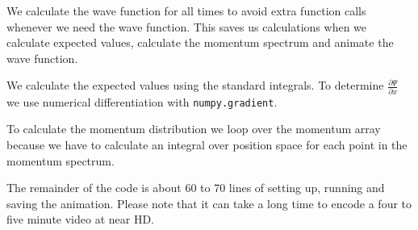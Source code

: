 \documentclass[12pt,a4paper]{article}
\newcommand{\pdiff}[2]{\frac{\partial #1}{\partial #2}}
\begin{document}


We calculate the wave function for all times to avoid extra function calls whenever we need the wave function. This saves us calculations when we calculate expected values, calculate the momentum spectrum and animate the wave function.



We calculate the expected values using the standard integrals. To determine $\pdiff{\Psi}{x}$ we use numerical differentiation with \lstinline{numpy.gradient}.


To calculate the momentum distribution we loop over the momentum array because we have to calculate an integral over position space for each point in the momentum spectrum.

The remainder of the code is about 60 to 70 lines of setting up, running and saving the animation. Please note that it can take a long time to encode a four to five minute video at near HD.
\end{document}
